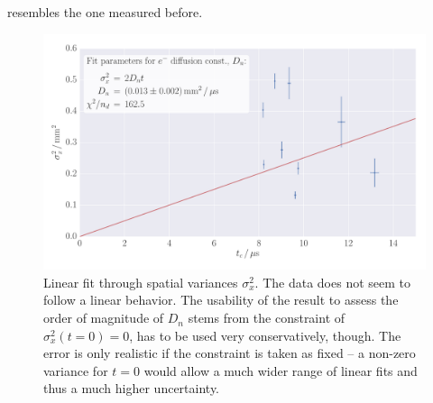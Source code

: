 resembles the one measured before. 
\begin{figure}
    \includegraphics[width=1.0\textwidth]{figures/haynes_shockley_D_U}
    \caption{
        Linear fit through spatial variances $\sigma_x^2$. 
        The data does not seem to follow a linear behavior. 
        The usability of the result to assess the order of magnitude 
        of $D_n$ stems from the constraint of $\sigma_x^2(t = 0) = 0$, 
        has to be used very conservatively, though. The error 
        is only realistic if the constraint is taken as fixed -- 
        a non-zero variance for $t = 0$ would allow a much wider range of
        linear fits and thus a much higher uncertainty. 
        }
    \label{fig:h_s_D_U}
\end{figure}


